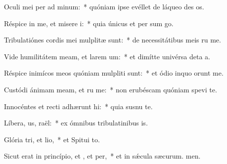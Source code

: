 \item Oculi mei per ad minum:~* quóniam ipse evéllet de láqueo des os.
\item Réspice in me, et misere i:~* quia únicus et per sum go.
\item Tribulatiónes cordis mei mulplitæ sunt:~* de necessitátibus meis ru me.
\item Vide humilitátem meam, et larem um:~* et dimítte univérsa deta a.
\item Réspice inimícos meos quóniam mulpliti sunt:~* et ódio inquo orunt me.
\item Custódi ánimam meam, et ru me:~* non erubéscam quóniam spevi  te.
\item Innocéntes et recti adhærunt hi:~* quia susnu te.
\item Líbera, us, raël:~* ex ómnibus tribulatinibus is.
\item Glória tri, et lio,~* et Spitui to.
\item Sicut erat in princípio, et , et per,~* et in sǽcula sæcurum. men.
